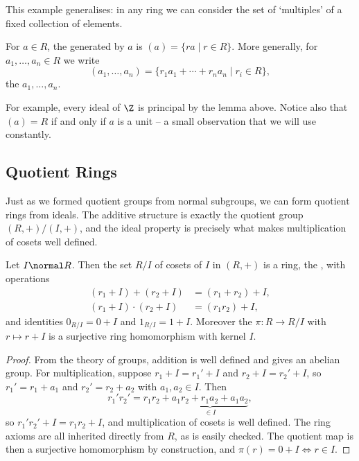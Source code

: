 This example generalises: in any ring we can consider the set of `multiples' of a fixed collection of elements.

\begin{definition}
	For $a \in R$, the  generated by $a$ is $(a) = \{ra \mid r \in R\}$. More generally, for $a_1, \dots, a_n \in R$ we write
	$$
	(a_1, \dots, a_n) = \{r_1 a_1 + \cdots + r_n a_n \mid r_i \in R\},
	$$
	the  $a_1, \dots, a_n$.
\end{definition}

For example, every ideal of $\Z$ is principal by the lemma above. Notice also that $(a) = R$ if and only if $a$ is a unit -- a small observation that we will use constantly.

\subsection{Quotient Rings}

Just as we formed quotient groups from normal subgroups, we can form quotient rings from ideals. The additive structure is exactly the quotient group $(R, +)/(I, +)$, and the ideal property is precisely what makes multiplication of cosets well defined.

\begin{theorem}
	Let $I \normal R$. Then the set $R/I$ of cosets of $I$ in $(R, +)$ is a ring, the , with operations
	\begin{align*}
		(r_1 + I) + (r_2 + I) &= (r_1 + r_2) + I, \\
		(r_1 + I) \cdot (r_2 + I) &= (r_1 r_2) + I,
	\end{align*}
	and identities $0_{R/I} = 0 + I$ and $1_{R/I} = 1 + I$. Moreover the  $\pi: R \rightarrow R/I$ with $r \mapsto r + I$ is a surjective ring homomorphism with kernel $I$.
\end{theorem}
\begin{proof}
	From the theory of groups, addition is well defined and gives an abelian group. For multiplication, suppose $r_1 + I = r_1' + I$ and $r_2 + I = r_2' + I$, so $r_1' = r_1 + a_1$ and $r_2' = r_2 + a_2$ with $a_1, a_2 \in I$. Then
	$$
	r_1' r_2' = r_1 r_2 + \underbrace{a_1 r_2 + r_1 a_2 + a_1 a_2}_{\in I},
	$$
	so $r_1'r_2' + I = r_1 r_2 + I$, and multiplication of cosets is well defined. The ring axioms are all inherited directly from $R$, as is easily checked. The quotient map is then a surjective homomorphism by construction, and $\pi(r) = 0 + I \iff r \in I$.
\end{proof}


